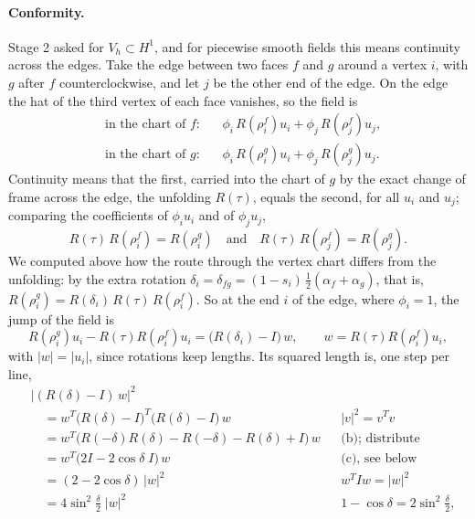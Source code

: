 \paragraph{Conformity.} Stage 2 asked for $V_h \subset H^1$, and for piecewise smooth fields this means continuity across the edges. Take the edge between two faces $f$ and $g$ around a vertex $i$, with $g$ after $f$ counterclockwise, and let $j$ be the other end of the edge. On the edge the hat of the third vertex of each face vanishes, so the field is
\begin{equation*}
\begin{aligned}
&\text{in the chart of } f: && \phi_i\, R(\rho_i^f)u_i + \phi_j\, R(\rho_j^f)u_j, \\
&\text{in the chart of } g: && \phi_i\, R(\rho_i^g)u_i + \phi_j\, R(\rho_j^g)u_j .
\end{aligned}
\end{equation*}
Continuity means that the first, carried into the chart of $g$ by the exact change of frame across the edge, the unfolding $R(\tau)$, equals the second, for all $u_i$ and $u_j$; comparing the coefficients of $\phi_iu_i$ and of $\phi_ju_j$,
\begin{equation*}
R(\tau)\, R(\rho_i^f) = R(\rho_i^g) \quad\text{and}\quad R(\tau)\, R(\rho_j^f) = R(\rho_j^g) .
\end{equation*}
We computed above how the route through the vertex chart differs from the unfolding: by the extra rotation $\delta_i = \delta_{fg} = (1 - s_i)\,\frac12(\alpha_f + \alpha_g)$, that is, $R(\rho_i^g) = R(\delta_i)\, R(\tau)\, R(\rho_i^f)$. So at the end $i$ of the edge, where $\phi_i = 1$, the jump of the field is
\begin{equation*}
R(\rho_i^g)u_i - R(\tau)R(\rho_i^f)u_i = \big(R(\delta_i) - I\big)\, w, \qquad w = R(\tau)R(\rho_i^f)u_i ,
\end{equation*}
with $|w| = |u_i|$, since rotations keep lengths. Its squared length is, one step per line,
\begin{align*}
&\big|(R(\delta) - I)\,w\big|^2 \\
&\quad= w^T\big(R(\delta) - I\big)^T\big(R(\delta) - I\big)\,w && |v|^2 = v^Tv \\
&\quad= w^T\big(R(-\delta)R(\delta) - R(-\delta) - R(\delta) + I\big)\,w && \text{(b); distribute} \\
&\quad= w^T\big(2I - 2\cos\delta\; I\big)\,w && \text{(c), see below} \\
&\quad= (2 - 2\cos\delta)\,|w|^2 && w^TIw = |w|^2 \\
&\quad= 4\sin^2\tfrac{\delta}{2}\;|w|^2 && 1 - \cos\delta = 2\sin^2\tfrac\delta2 ,
\end{align*}

